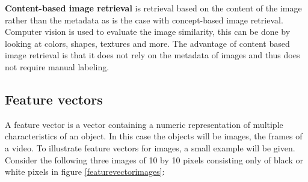 \documentclass{article}
\begin{document}
\textbf{Content-based image retrieval} is retrieval based on the content of the image rather than the metadata as is the case with concept-based image retrieval. Computer vision is used to evaluate the image similarity, this can be done by looking at colors, shapes, textures and more. The advantage of content based image retrieval is that it does not rely on the metadata of images and thus does not require manual labeling.

\subsection{Feature vectors}
A feature vector is a vector containing a numeric representation of multiple characteristics of an object. In this case the objects will be images, the frames of a video. To illustrate feature vectors for images, a small example will be given. Consider the following three images of 10 by 10 pixels consisting only of black or white pixels in figure \ref{featurevectorimages}: 
\end{document}
